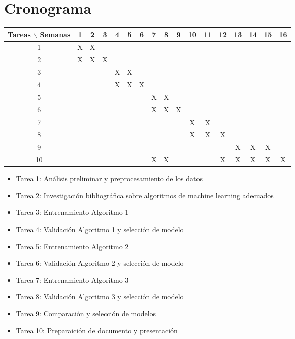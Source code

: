 \documentclass[12pt]{article}
\begin{document}
\section{Cronograma}

\begin{table}[htb]
	\begin{tabular}{|c|cccccccccccccccc| }
	\hline
	Tareas $\backslash$ Semanas & 1 & 2 & 3 & 4 & 5 & 6 & 7 & 8 & 9 & 10 & 11 & 12 & 13 & 14 & 15 & 16  \\
	\hline
	1 & X & X &   &   &   &   &   &  &  &   &   &   &   &   &   &   \\
	2 &  X & X & X &   &  &  &  &   &   &  &  &  &   &  &  &   \\
	3 &   &   &   & X & X  &   &   &  &   &   &   &  &   &   &  &   \\
	4 &  &  &  & X & X & X &  &  &  &  &   &   &   &   &   &   \\
	5 &  &   &   &   &  &   &  X & X  & &   &   &  &   &   &  &   \\
	6 &  &  &   &   &   &   & X  & X & X &   &   &   &   &   &   &   \\
	7 &   &  &  &   &  &  &  &   &   & X & X &  &  &  &  &   \\
	8 &   &   &   &  &   &   &   &  &   & X  &  X & X &  &   &  &   \\
	9 &  &  &  &  &  &  &  &  &  & &   &   &  X &  X & X  &   \\
	10 &   &   &   &   &  &   &  X & X  &  &   &   & X &  X & X  & X &  X \\
	\hline
	\end{tabular}
\end{table}
\vspace{1mm}

\begin{itemize}
	\item Tarea 1:  Análisis preliminar y preprocesamiento de los datos
	\item Tarea 2: Investigación bibliográfica sobre algoritmos de machine learning adecuados
	\item Tarea 3: Entrenamiento Algoritmo 1
	\item Tarea 4: Validación Algoritmo  1 y selección de modelo
	\item Tarea 5: Entrenamiento Algoritmo 2
	\item Tarea 6: Validación Algoritmo  2 y selección de modelo
	\item Tarea 7: Entrenamiento Algoritmo 3
	\item Tarea 8: Validación Algoritmo  3 y selección de modelo
	\item Tarea 9: Comparación y selección de modelos 
	\item Tarea 10: Preparaición de documento y presentación
\end{itemize}
\end{document}
